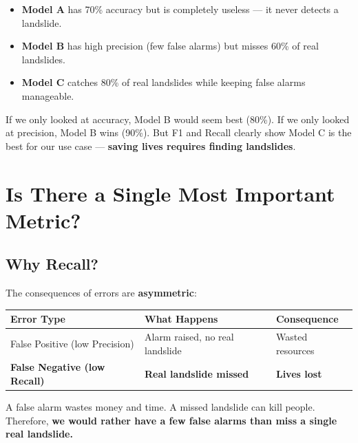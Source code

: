 \documentclass[11pt]{article}
\begin{document}
\begin{itemize}[noitemsep]
    \item \textbf{Model A} has 70\% accuracy but is completely useless --- it never detects a landslide.
    \item \textbf{Model B} has high precision (few false alarms) but misses 60\% of real landslides.
    \item \textbf{Model C} catches 80\% of real landslides while keeping false alarms manageable.
\end{itemize}

\noindent If we only looked at accuracy, Model B would seem best (80\%).
If we only looked at precision, Model B wins (90\%).
But F1 and Recall clearly show Model C is the best for our use case --- \textbf{saving lives requires finding landslides}.

\section{Is There a Single Most Important Metric?}

\begin{center}
\end{center}

\subsection{Why Recall?}

The consequences of errors are \textbf{asymmetric}:

\begin{center}
\renewcommand{\arraystretch}{1.3}
\begin{tabular}{lll}
\toprule
\textbf{Error Type} & \textbf{What Happens} & \textbf{Consequence} \\ \midrule
False Positive (low Precision) & Alarm raised, no real landslide & Wasted resources \\
\textbf{False Negative (low Recall)} & \textbf{Real landslide missed} & \textbf{Lives lost} \\
\bottomrule
\end{tabular}
\end{center}

\noindent A false alarm wastes money and time.
A missed landslide can kill people.
Therefore, \textbf{we would rather have a few false alarms than miss a single real landslide.}
\end{document}
